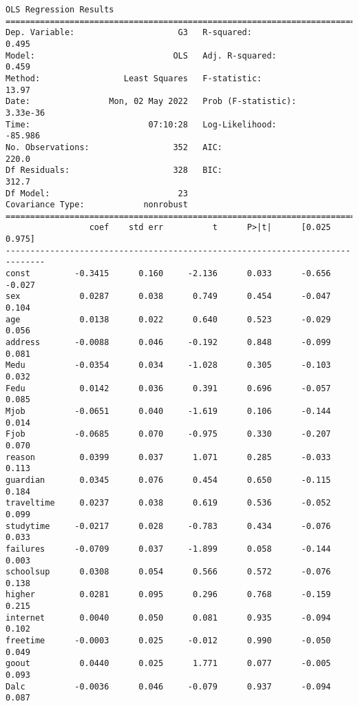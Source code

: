     \begin{Verbatim}[commandchars=\\\{\}]
                            OLS Regression Results
==============================================================================
Dep. Variable:                     G3   R-squared:                       0.495
Model:                            OLS   Adj. R-squared:                  0.459
Method:                 Least Squares   F-statistic:                     13.97
Date:                Mon, 02 May 2022   Prob (F-statistic):           3.33e-36
Time:                        07:10:28   Log-Likelihood:                -85.986
No. Observations:                 352   AIC:                             220.0
Df Residuals:                     328   BIC:                             312.7
Df Model:                          23
Covariance Type:            nonrobust
==============================================================================
                 coef    std err          t      P>|t|      [0.025      0.975]
------------------------------------------------------------------------------
const         -0.3415      0.160     -2.136      0.033      -0.656      -0.027
sex            0.0287      0.038      0.749      0.454      -0.047       0.104
age            0.0138      0.022      0.640      0.523      -0.029       0.056
address       -0.0088      0.046     -0.192      0.848      -0.099       0.081
Medu          -0.0354      0.034     -1.028      0.305      -0.103       0.032
Fedu           0.0142      0.036      0.391      0.696      -0.057       0.085
Mjob          -0.0651      0.040     -1.619      0.106      -0.144       0.014
Fjob          -0.0685      0.070     -0.975      0.330      -0.207       0.070
reason         0.0399      0.037      1.071      0.285      -0.033       0.113
guardian       0.0345      0.076      0.454      0.650      -0.115       0.184
traveltime     0.0237      0.038      0.619      0.536      -0.052       0.099
studytime     -0.0217      0.028     -0.783      0.434      -0.076       0.033
failures      -0.0709      0.037     -1.899      0.058      -0.144       0.003
schoolsup      0.0308      0.054      0.566      0.572      -0.076       0.138
higher         0.0281      0.095      0.296      0.768      -0.159       0.215
internet       0.0040      0.050      0.081      0.935      -0.094       0.102
freetime      -0.0003      0.025     -0.012      0.990      -0.050       0.049
goout          0.0440      0.025      1.771      0.077      -0.005       0.093
Dalc          -0.0036      0.046     -0.079      0.937      -0.094       0.087

\end{Verbatim}
